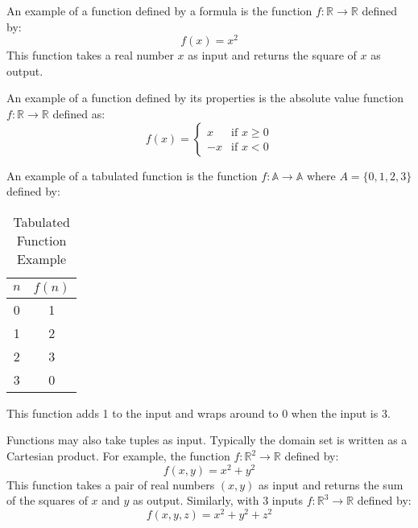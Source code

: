 An example of a function defined by a formula is the function \( f: \mathbb{R} \to \mathbb{R} \)
defined by:
\[
  f(x) = x^2
\]
\noindent This function takes a real number \( x \) as input and returns the square of \( x \) as
output.

An example of a function defined by its properties is the absolute value function
\( f: \mathbb{R} \to \mathbb{R} \) defined as:
\[
  f(x) = \begin{cases}
    x & \text{if } x \geq 0 \\
    -x & \text{if } x < 0
  \end{cases}
\]

An example of a tabulated function is the function \( f: \mathbb{A} \to \mathbb{A} \)
where \( A = \{ 0, 1, 2, 3 \}\) defined by:
\begin{table}[H]
  \centering
  \begin{tabular}{cc}
    \toprule
    \textbf{\(n\)} & \textbf{\(f(n)\)} \\
    \midrule
    0 & 1 \\
    1 & 2 \\
    2 & 3 \\
    3 & 0 \\
    \bottomrule
  \end{tabular}
  \caption{Tabulated Function Example}
\end{table}
\noindent This function adds 1 to the input and wraps around to 0 when the input is 3.

Functions may also take tuples as input. Typically the domain set is written as a Cartesian
product. For example, the function \( f: \mathbb{R}^2 \to \mathbb{R} \) defined by:
\[
  f(x, y) = x^2 + y^2
\]
\noindent This function takes a pair of real numbers \( (x, y) \) as input and returns the sum of
the squares of \( x \) and \( y \) as output. Similarly, with 3 inputs \( f: \mathbb{R}^3 \to
\mathbb{R} \) defined by:
\[
  f(x, y, z) = x^2 + y^2 + z^2
\]

